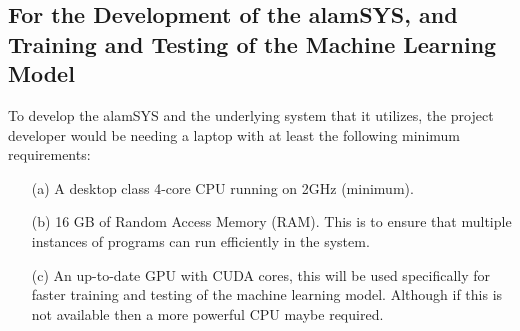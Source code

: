 \subsection{For the Development of the alamSYS, and Training 
and Testing of the Machine Learning Model}
\label{subsec:alamSYS_hardware}
To develop the alamSYS and the underlying system that it utilizes, 
the project developer would be needing a laptop with at least the 
following minimum requirements:
\begin{itemize}
    \item[(a)] A desktop class 4-core CPU running on 2GHz (minimum).
    \item[(b)] 16 GB of Random Access Memory (RAM). 
    This is to ensure that multiple instances of programs 
    can run efficiently in the system.
    \item[(c)] An up-to-date GPU with CUDA cores, this will be used 
    specifically for faster training and testing of the machine learning model. 
    Although if this is not available then a more powerful CPU maybe required.
\end{itemize}